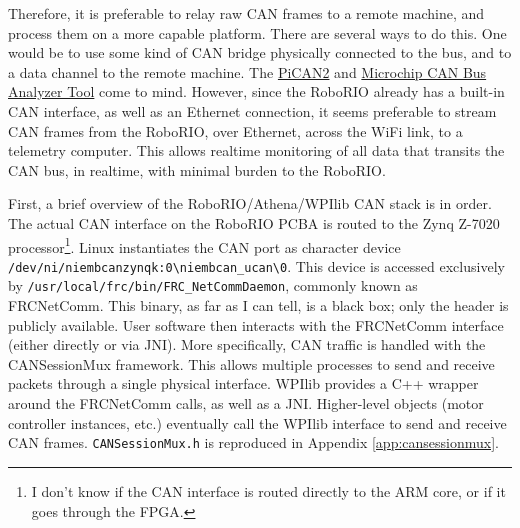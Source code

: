 \documentclass[12pt]{article}
\begin{document}
\par Therefore, it is preferable to relay raw CAN frames to a remote machine, and process them on a more capable platform. There are several ways to do this. One would be to use some kind of CAN bridge physically connected to the bus, and to a data channel to the remote machine. The \href{https://copperhilltech.com/pican-2-can-interface-for-raspberry-pi-2-3/}{PiCAN2} and \href{https://www.microchip.com/DevelopmentTools/ProductDetails/PartNO/APGDT002}{Microchip CAN Bus Analyzer Tool} come to mind. However, since the RoboRIO already has a built-in CAN interface, as well as an Ethernet connection, it seems preferable to stream CAN frames from the RoboRIO, over Ethernet, across the WiFi link, to a telemetry computer. This allows realtime monitoring of all data that transits the CAN bus, in realtime, with minimal burden to the RoboRIO. 

\par First, a brief overview of the RoboRIO/Athena/WPIlib CAN stack is in order. The actual CAN interface on the RoboRIO PCBA is routed to the Zynq Z-7020 processor\footnote{I don't know if the CAN interface is routed directly to the ARM core, or if it goes through the FPGA.}. Linux instantiates the CAN port as character device \texttt{/dev/ni/niembcanzynqk:0\textbackslash niembcan\_ucan\textbackslash 0}. This device is accessed exclusively by \texttt{/usr/local/frc/bin/FRC\_NetCommDaemon},  commonly known as FRCNetComm. This binary, as far as I can tell, is a black box; only the header is publicly available. User software then interacts with the FRCNetComm interface (either directly or via JNI). More specifically, CAN traffic is handled with the CANSessionMux framework. This allows multiple processes to send and receive packets through a single physical interface. WPIlib provides a C++ wrapper around the FRCNetComm calls, as well as a JNI. Higher-level objects (motor controller instances, etc.) eventually call the WPIlib interface to send and receive CAN frames. \texttt{CANSessionMux.h} is reproduced in Appendix \ref{app:cansessionmux}.
\end{document}
